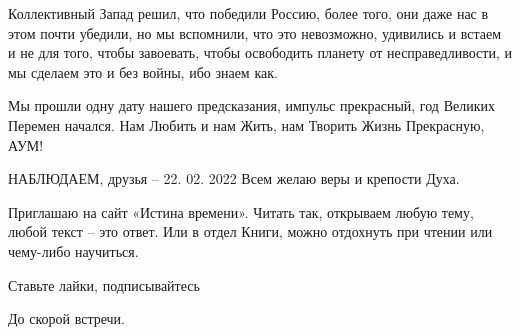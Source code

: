 Коллективный Запад решил, что победили Россию, более того, они даже нас в этом
почти убедили, но мы вспомнили, что это невозможно, удивились и встаем и не для
того, чтобы завоевать, чтобы освободить планету от несправедливости, и мы
сделаем это и без войны, ибо знаем как.

Мы прошли одну дату нашего предсказания, импульс прекрасный, год Великих
Перемен начался. Нам Любить и нам Жить, нам Творить Жизнь Прекрасную, АУМ!

НАБЛЮДАЕМ, друзья – 22. 02. 2022 Всем желаю веры и крепости Духа.

Приглашаю на сайт «Истина времени». Читать так, открываем любую тему, любой
текст – это ответ. Или в отдел Книги, можно отдохнуть при чтении или чему-либо
научиться.

Ставьте лайки, подписывайтесь

До скорой встречи.
